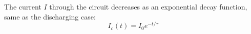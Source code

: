 %

The current $I$ through the circuit decreases as an exponential decay function,
same as the discharging case:
\begin{equation}
    \boxed{I_c(t)=I_0e^{-t/\tau}}
\end{equation}


